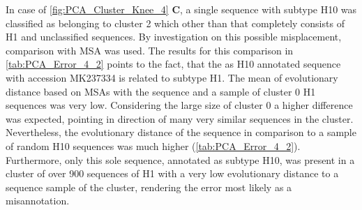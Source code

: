 In case of \autoref{fig:PCA_Cluster_Knee_4} \textbf{\textsf{C}}, a single sequence with subtype H10 was classified as belonging to cluster 2 which other than that completely consists of H1 and unclassified sequences. By investigation on this possible misplacement, comparison with \gls{MSA} was used. The results for this comparison in \autoref{tab:PCA_Error_4_2} points to the fact, that the as H10 annotated sequence with accession MK237334 is related to subtype H1. The mean of evolutionary distance based on \glspl{MSA} with the sequence and a sample of cluster 0 H1 sequences was very low. Considering the large size of cluster 0 a higher difference was expected, pointing in direction of many very similar sequences in the cluster. Nevertheless, the evolutionary distance of the sequence in comparison to a sample of random H10 sequences was much higher (\autoref{tab:PCA_Error_4_2}). %
Furthermore, only this sole sequence, annotated as subtype H10, was present in a cluster of over 900 sequences of H1 with a very low evolutionary distance to a sequence sample of the cluster, rendering the error most likely as a misannotation.

\begin{table}[!hbt]
    \centering
    \caption[Anomalies in segment 4 cluster 48 with PK]{\textbf{Anomalies in segment 4 cluster 48 with PK.} The \glspl{MSA} mean distance of the given sequences in comparison to a sample of H16 sequences of the same cluster and a sample of H13 sequences present in another cluster. Only the first 20 columns are presented here, the full table can be found in the projects GitHub Repository\footnotemark.}
    \label{tab:PCA_Error_4_48}
\end{table}


